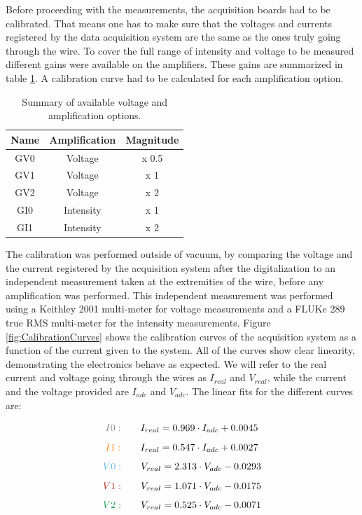 Before proceeding with the measurements, the acquisition boards had to be calibrated. That means one has to make sure that the voltages and currents registered by the data acquisition system are the same as the ones truly going through the wire. To cover the full range of intensity and voltage to be measured different gains were available on the amplifiers. These gains are summarized in table \ref{tab:AvGains}. A calibration curve had to be calculated for each amplification option. 

\begin{table}[h]
    \centering
    \begin{tabular}{ccc}
    \hline
    Name & Amplification & Magnitude \\ \hline
    GV0  & Voltage       & x 0.5     \\
    GV1  & Voltage       & x 1       \\
    GV2  & Voltage       & x 2       \\
    GI0  & Intensity     & x 1       \\
    GI1  & Intensity     & x 2       \\ \hline
    \end{tabular}
    \caption{Summary of available voltage and amplification options. }
    \label{tab:AvGains}
\end{table}

The calibration was performed outside of vacuum, by comparing the voltage and the current registered by the acquisition system after the digitalization to an independent measurement taken at the extremities of the wire, before any amplification was performed. This independent measurement was performed using a Keithley 2001 multi-meter for voltage measurements and a FLUKe 289 true RMS multi-meter for the intensity measurements. Figure \ref{fig:CalibrationCurves} shows the calibration curves of the acquisition system as a function of the current given to the system. All of the curves show clear linearity, demonstrating the electronics behave as expected. We will refer to the real current and voltage going through the wires as $I_{real}$ and $V_{real}$, while the current and the voltage provided are $I_{adc}$ and $V_{adc}$. The linear fits for the different curves are: 

\begin{equation}
    \textcolor{gray}{I0:} \qquad I_{real} = 0.969 \cdot I_{adc} + 0.0045
\end{equation}
\begin{equation}
    \textcolor{orange}{I1:} \qquad I_{real} = 0.547 \cdot I_{adc} + 0.0027
\end{equation}
\begin{equation}
    {\color{CornflowerBlue}{V0:} }\qquad V_{real} = 2.313 \cdot V_{adc} - 0.0293
\end{equation}
\begin{equation}
    \textcolor{BrickRed}{V1:} \qquad V_{real} = 1.071 \cdot V_{adc} - 0.0175
\end{equation}
\begin{equation}
    \textcolor{ForestGreen}{V2:} \qquad V_{real} = 0.525 \cdot V_{adc} - 0.0071
\end{equation}
    
